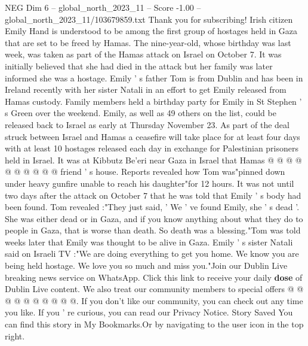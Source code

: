 \begin{textsample}{NEG Dim 6 – global\_north\_2023\_11 – Score -1.00 – global\_north\_2023\_11/103679859.txt}  \label{ex:f6_neg_231}
Thank you for subscribing!
Irish citizen Emily Hand is understood to be among the first group of hostages held in Gaza that are set to be freed by Hamas.
The nine-year-old, whose birthday was last week, was taken as part of the Hamas attack on Israel on October 7.
It was initially believed that she had died in the attack but her family was later informed she was a hostage.
Emily ' s father Tom is from Dublin and has been in Ireland recently with her sister Natali in an effort to get Emily released from Hamas custody.
Family members held a birthday party for Emily in St Stephen ' s Green over the weekend.
Emily, as well as 49 others on the list, could be released back to Israel as early at Thursday November 23.
As part of the deal struck between Israel and Hamas a ceasefire will take place for at least four days with at least 10 hostages released each day in exchange for Palestinian prisoners held in Israel.
It was at Kibbutz Be'eri near Gaza in Israel that Hamas @ @ @ @ @ @ @ @ @ @ friend ' s house.
Reports revealed how Tom was"pinned down under heavy gunfire unable to reach his daughter"for 12 hours.
It was not until two days after the attack on October 7 that he was told that Emily ' s body had been found.
Tom revealed :"They just said, ' We ' ve found Emily, she ' s dead '.
She was either dead or in Gaza, and if you know anything about what they do to people in Gaza, that is worse than death.
So death was a blessing."Tom was told weeks later that Emily was thought to be alive in Gaza.
Emily ' s sister Natali said on Israeli TV :"We are doing everything to get you home.
We know you are being held hostage.
We love you so much and miss you."Join our Dublin Live breaking news service on WhatsApp.
Click this link to receive your daily \textbf{dose} of Dublin Live content.
We also treat our community members to special offers @ @ @ @ @ @ @ @ @ @.
If you don't like our community, you can check out any time you like.
If you ' re curious, you can read our Privacy Notice.
Story Saved You can find this story in My Bookmarks.Or by navigating to the user icon in the top right.

\end{textsample}
